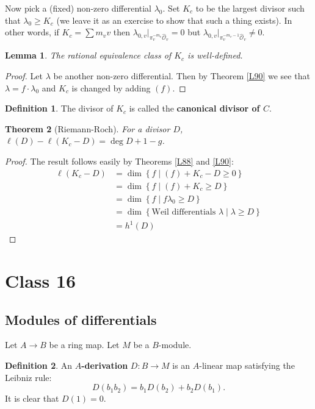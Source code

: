 \documentclass{article}
\theoremstyle{plain}
\newtheorem{thm}{Theorem}
\newtheorem{lem}[thm]{Lemma}
\theoremstyle{definition}
\newtheorem{defn}{Definition}
\theoremstyle{remark}
\begin{document}
Now pick a (fixed) non-zero differential $\lambda_0$. Set $K_c$ to be the largest divisor such that $\lambda_0\geq K_c$ (we leave it as an exercise to show that such a thing exists). In other words, if $K_c=\sum m_vv$ then $\lambda_{0,v}|_{\pi_v^{-m_v}\hat{\mathcal{O}}_v}=0$ but $\lambda_{0,v}|_{\pi_v^{-m_v-1}\hat{\mathcal{O}}_v}\neq0$.

\begin{lem}
\label{L91}
The rational equivalence class of $K_c$ is well-defined.
\end{lem}
\begin{proof}
Let $\lambda$ be another non-zero differential. Then by Theorem \ref{L90} we see that $\lambda=f\cdot \lambda_0$ and $K_c$ is changed by adding $(f)$.
\end{proof}

\begin{defn}
The divisor of $K_c$ is called the \textbf{canonical divisor of $C$}.
\end{defn}

\begin{thm}[Riemann-Roch]
For a divisor $D$, $\ell(D)-\ell(K_c-D)=\deg D+1-g$.
\end{thm}
\begin{proof}
The result follows easily by Theorems \ref{L88} and \ref{L90}:
\begin{align*}
\ell(K_c-D)&=\dim\left\{f\mid (f)+K_c-D\geq 0\right\}\\
&=\dim\left\{f\mid (f)+K_c\geq D\right\}\\
&=\dim\left\{f\mid f\lambda_0\geq D\right\}\\
&=\dim\left\{\text{Weil differentials }\lambda \mid \lambda\geq D\right\}\\
&=h^1(D)
\end{align*}
\end{proof}

\section*{Class 16}

\subsection*{Modules of differentials}

Let $A\to B$ be a ring map. Let $M$ be a $B$-module.

\begin{defn}
An \textbf{$A$-derivation} $D:B\to M$ is an $A$-linear map satisfying the Leibniz rule:
\[D(b_1b_2)=b_1D(b_2)+b_2D(b_1).\]
It is clear that $D(1)=0$.
\end{defn}
\end{document}
